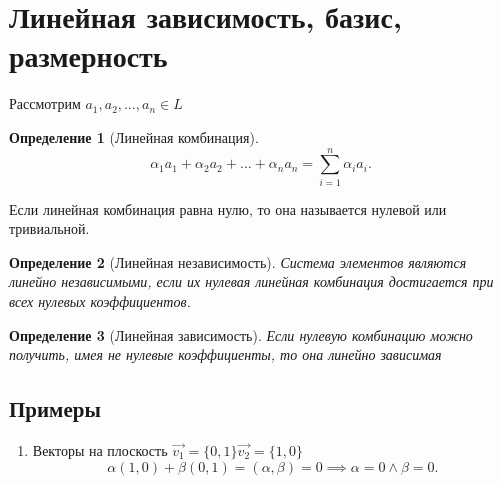 \documentclass{scrartcl}
\newtheorem{definition}{Определение}
\begin{document}
\section{Линейная зависимость, базис, размерность}
Рассмотрим $a_1,a_2,\dots,a_{n} \in L$
\begin{definition}[Линейная комбинация]
	\[
		\alpha_1 a_1 + \alpha_2a_2 + \dots + \alpha_{n}a_{n} = \sum_{i=1}^{n} \alpha_{i} a_{i}
		.\]
\end{definition}
Если линейная комбинация равна нулю, то она называется нулевой или тривиальной.
\begin{definition}[Линейная независимость]
	Система элементов являются линейно независимыми, если их нулевая линейная комбинация достигается при всех нулевых коэффициентов.
\end{definition}
\begin{definition}[Линейная зависимость]
	Если нулевую комбинацию можно получить, имея не нулевые коэффициенты, то она
	линейно зависимая
\end{definition}
\subsection{Примеры}
\begin{enumerate}
	\item Векторы на плоскость $\vec{v_1} = \{0,1\} \vec{v_2} =\{1,0\}$
	      \[
		      \alpha(1,0) + \beta(0,1) = (\alpha,\beta) = 0 \implies \alpha = 0 \land \beta = 0
		      .\]
\end{enumerate}
\end{document}
